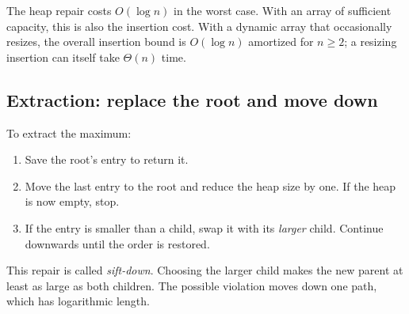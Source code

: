 \documentclass[a4paper,12pt,oneside]{report}
\begin{document}
The heap repair costs $O(\log n)$ in the worst case. With an
array of sufficient capacity, this is also the insertion cost.
With a dynamic array that occasionally resizes, the overall
insertion bound is $O(\log n)$ amortized for $n\geq2$; a resizing
insertion can itself take $\Theta(n)$ time.

\subsection{Extraction: replace the root and move down}

To extract the maximum:
\begin{enumerate}
  \item Save the root's entry to return it.
  \item Move the last entry to the root and reduce the heap size by
    one. If the heap is now empty, stop.
  \item If the entry is smaller than a child, swap it with its
    \emph{larger} child. Continue downwards until the order is restored.
\end{enumerate}
This repair is called \emph{sift-down}. Choosing the larger child
makes the new parent at least as large as both children. The
possible violation moves down one path, which has logarithmic length.
\end{document}
